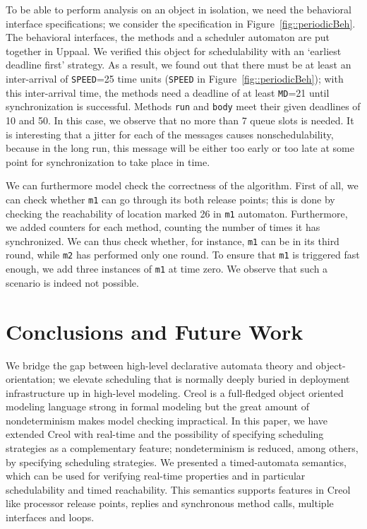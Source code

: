 \documentclass[copyright,creativecommons]{eptcs}
\theoremstyle{definition}
\renewcommand{\paragraph}[1]{\medskip \noindent {\bf #1}}
\newcommand{\Uppaal}{{\sc Uppaal}\xspace}
\begin{document}
\paragraph{Example}
To be able to perform  analysis on an object in isolation, we need the behavioral interface specifications; we consider the specification in Figure~\ref {fig::periodicBeh}.
The behavioral interfaces, the methods and a scheduler automaton are put together in \Uppaal.
We verified this object for schedulability with an `earliest deadline first' strategy.
As a result, we found out that there must be at least an inter-arrival of \lstinline$SPEED$=25 time units (\lstinline$SPEED$ in Figure~\ref {fig::periodicBeh}); with this inter-arrival time, the methods need a deadline of at least \lstinline$MD$=21 until synchronization is successful.
Methods \lstinline$run$ and \lstinline$body$ meet their given deadlines of 10 and 50.
In this case, we observe that no more than 7 queue slots is needed.
It is interesting that a jitter for each of the messages  causes nonschedulability, because in the long run, this message will be either too early or too late at some point for synchronization to take place in time.


We can furthermore model check the correctness of the algorithm.
First of all, we can check whether \lstinline{m1} can go through its both release points; this is done by checking the reachability of location marked 26 in \lstinline{m1} automaton.
Furthermore, we added counters for each method, counting the number of times it has synchronized. We can thus check whether, for instance, \lstinline$m1$ can be in its third round, while \lstinline$m2$ has performed only one round. To ensure that \lstinline$m1$ is triggered fast enough, we add three instances of \lstinline$m1$ at time zero.
We observe that such a scenario is indeed not possible.



\section{Conclusions and Future Work}
\label{sec:conc}
We bridge the gap between high-level declarative automata theory and object-orientation; we elevate scheduling that is normally deeply buried in deployment infrastructure up in high-level modeling.
Creol is a full-fledged object oriented modeling language
strong in formal modeling but the great amount of nondeterminism makes model checking impractical.
In this paper, we have extended Creol with real-time and the possibility of specifying scheduling strategies as a complementary feature; nondeterminism is reduced, among others, by specifying scheduling strategies.
We presented a timed-automata semantics, which can be used for verifying real-time properties and in particular schedulability and timed reachability.
This semantics supports features in Creol like processor release points, replies and synchronous method calls, multiple interfaces and loops.
\end{document}
